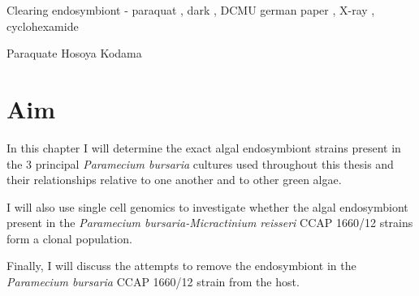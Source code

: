 Clearing endosymbiont - paraquat \citep{Hosoya1995a}, dark \citep{Karakashian1963}, DCMU german paper \citep{Reisser1976},
X-ray \citep{Wichterman1948}, cyclohexamide \citep{Weis1984,Kodama2007}



Paraquate Hosoya 
Kodama
%






\section{Aim}

In this chapter I will determine the exact algal endosymbiont strains present
in the 3 principal \textit{Paramecium bursaria} cultures used throughout
this thesis and their relationships relative to one another and to
other green algae.

I will also use single cell genomics to investigate whether the algal
endosymbiont present in the \textit{Paramecium bursaria-Micractinium reisseri}
CCAP 1660/12 strains form a clonal population. 

Finally, I will discuss the attempts to remove the endosymbiont in the 
\textit{Paramecium bursaria} CCAP 1660/12 strain from the host.




